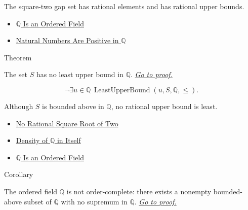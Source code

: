 \begin{remark*}[Interpretation]
The square-two gap set has rational elements and has rational upper bounds.
\end{remark*}

\begin{dependencies}
\begin{itemize}
  \item \hyperref[thm:q-is-an-ordered-field]{$\mathbb{Q}$ Is an Ordered Field}
  \item \hyperref[cor:natural-numbers-positive-on-q]{Natural Numbers Are Positive in $\mathbb{Q}$}
\end{itemize}
\end{dependencies}

\begin{theorembox}{Theorem}
\begin{theorem}
\label{thm:gap-set-no-rational-supremum-q}
The set $S$ has no least upper bound in $\mathbb{Q}$.
\hyperref[prf:gap-set-no-rational-supremum-q]{\textit{Go to proof.}}
\end{theorem}
\end{theorembox}

\begin{remark*}
\[
\neg\exists u\in\mathbb{Q}\,
\operatorname{LeastUpperBound}(u,S,\mathbb{Q},\le).
\]
\end{remark*}

\begin{remark*}[Interpretation]
Although $S$ is bounded above in $\mathbb{Q}$, no rational upper bound is least.
\end{remark*}

\begin{dependencies}
\begin{itemize}
  \item \hyperref[thm:no-rational-square-root-of-two]{No Rational Square Root of Two}
  \item \hyperref[thm:density-of-q]{Density of $\mathbb{Q}$ in Itself}
  \item \hyperref[thm:q-is-an-ordered-field]{$\mathbb{Q}$ Is an Ordered Field}
\end{itemize}
\end{dependencies}

\begin{corollarybox}{Corollary}
\begin{corollary}
\label{cor:q-order-incomplete}
The ordered field $\mathbb{Q}$ is not order-complete: there exists a nonempty
bounded-above subset of $\mathbb{Q}$ with no supremum in $\mathbb{Q}$.
\hyperref[prf:q-order-incomplete]{\textit{Go to proof.}}
\end{corollary}
\end{corollarybox}

